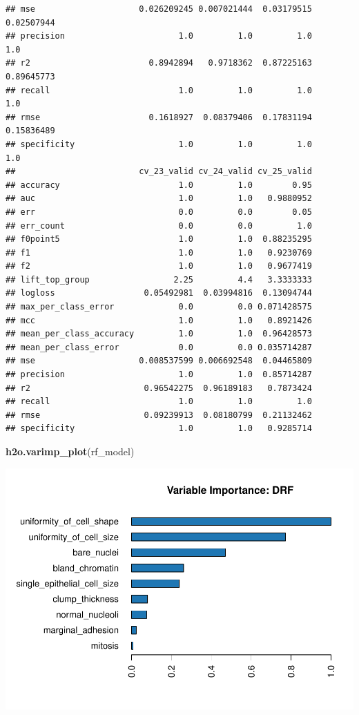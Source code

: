 \documentclass[]{article}
\newenvironment{Shaded}{\begin{snugshade}}{\end{snugshade}}
\newcommand{\KeywordTok}[1]{\textcolor[rgb]{0.13,0.29,0.53}{\textbf{{#1}}}}
\newcommand{\NormalTok}[1]{{#1}}
\begin{document}
\begin{verbatim}
## mse                     0.026209245 0.007021444  0.03179515  0.02507944
## precision                       1.0         1.0         1.0         1.0
## r2                        0.8942894   0.9718362  0.87225163  0.89645773
## recall                          1.0         1.0         1.0         1.0
## rmse                      0.1618927  0.08379406  0.17831194  0.15836489
## specificity                     1.0         1.0         1.0         1.0
##                         cv_23_valid cv_24_valid cv_25_valid
## accuracy                        1.0         1.0        0.95
## auc                             1.0         1.0   0.9880952
## err                             0.0         0.0        0.05
## err_count                       0.0         0.0         1.0
## f0point5                        1.0         1.0  0.88235295
## f1                              1.0         1.0   0.9230769
## f2                              1.0         1.0   0.9677419
## lift_top_group                 2.25         4.4   3.3333333
## logloss                  0.05492981  0.03994816  0.13094744
## max_per_class_error             0.0         0.0 0.071428575
## mcc                             1.0         1.0   0.8921426
## mean_per_class_accuracy         1.0         1.0  0.96428573
## mean_per_class_error            0.0         0.0 0.035714287
## mse                     0.008537599 0.006692548  0.04465809
## precision                       1.0         1.0  0.85714287
## r2                       0.96542275  0.96189183   0.7873424
## recall                          1.0         1.0         1.0
## rmse                     0.09239913  0.08180799  0.21132462
## specificity                     1.0         1.0   0.9285714
\end{verbatim}

\begin{Shaded}
\begin{Highlighting}[]
\KeywordTok{h2o.varimp_plot}\NormalTok{(rf_model)}
\end{Highlighting}
\end{Shaded}

\includegraphics{webinar_code_files/figure-latex/unnamed-chunk-33-1.pdf}
\end{document}

